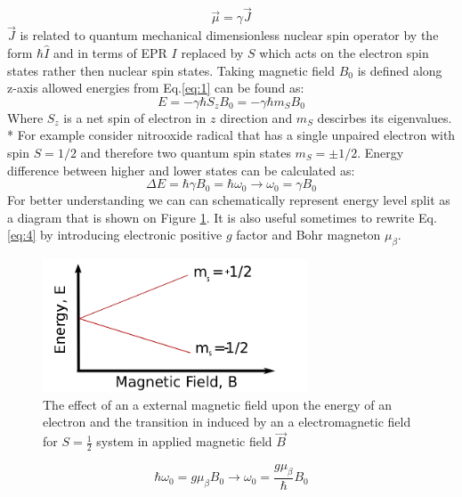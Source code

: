 \begin{equation}\label{eq:2}
\vec{\mu}=\gamma \vec{J}
\end{equation}
$\vec{J}$ is related to quantum mechanical dimensionless nuclear spin operator by the form $\hbar\hat{I}$ and in terms of EPR $I$ replaced by $S$ which acts on the electron spin states rather then nuclear spin states. Taking magnetic field $B_0$ is defined along z-axis allowed energies from Eq.\ref{eq:1} can be found as:
\begin{equation}\label{eq:3}
E=-\gamma\hbar S_z B_0=-\gamma\hbar m_S B_0
\end{equation} 
Where $S_z$ is a net spin of electron in $z$ direction and $m_S$ descirbes its eigenvalues. \\*
For example consider nitrooxide radical that has a single unpaired electron with spin $S=1/2$  and therefore two quantum spin states $m_S=\pm1/2$. Energy difference between higher and lower states can be calculated as:
\begin{equation}\label{eq:4}
\Delta E=\hbar \gamma B_0=\hbar \omega_0 \rightarrow \omega_0=\gamma B_0
\end{equation} 
For better understanding we can can schematically represent energy level split as a diagram that is shown on Figure \ref{figure:zeeman}. It is also useful sometimes to rewrite Eq.\ref{eq:4} by introducing electronic positive $g$ factor and Bohr magneton $\mu_{\beta}$. 
\begin{figure}[h!]
\begin{center}
\includegraphics[width=0.7\textwidth]{figures/chap1/zems.png}
\caption{The effect of an a external magnetic field upon the energy of an electron and
the transition in induced by an a electromagnetic field for $S=\frac{1}{2}$ system in applied magnetic field $\vec B$}
\label{figure:zeeman}
\end{center}
\end{figure}
\begin{equation}\label{eq:5}
\hbar \omega_0=g\mu_{\beta}B_0 \rightarrow \omega_0=\frac{g\mu_{\beta}}{\hbar}B_0
\end{equation} 
